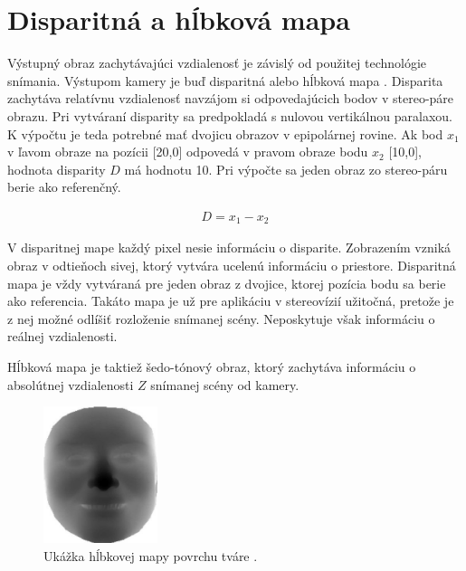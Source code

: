 %

\newpage

\section{Disparitná a hĺbková mapa}


Výstupný obraz zachytávajúci vzdialenosť je závislý od použitej technológie snímania. Výstupom kamery je buď disparitná alebo hĺbková mapa \cite{davies2004machine}. Disparita zachytáva relatívnu vzdialenosť navzájom si odpovedajúcich bodov v stereo-páre
obrazu. Pri vytváraní disparity sa predpokladá s nulovou vertikálnou paralaxou. K výpočtu je teda potrebné mať dvojicu obrazov v epipolárnej rovine. Ak bod $x_1$ v ľavom obraze na pozícii [20,0] odpovedá v pravom obraze bodu $x_2$ [10,0], hodnota disparity $D$ má hodnotu 10. Pri výpočte sa jeden obraz zo stereo-páru berie ako referenčný.  
	
\begin{equation}
\label{eq:disp}
\begin{aligned}
D=x_1-x_2
\end{aligned}
\end{equation}

V disparitnej mape každý pixel nesie informáciu o disparite. Zobrazením vzniká obraz v odtieňoch sivej, ktorý vytvára ucelenú informáciu o priestore. Disparitná mapa je vždy vytváraná pre jeden obraz z dvojice, ktorej pozícia bodu sa berie ako referencia. Takáto mapa je už pre aplikáciu v stereovízií užitočná, pretože je z nej možné odlíšiť rozloženie snímanej scény. Neposkytuje však informáciu o reálnej vzdialenosti.

Hĺbková mapa je taktiež šedo-tónový obraz, ktorý zachytáva informáciu o absolútnej vzdialenosti $Z$ snímanej scény od kamery. 

\begin{figure}[H]
	\centering
	\includegraphics[height=4cm]{figures/depth_map.jpeg} 
	\caption{Ukážka hĺbkovej mapy povrchu tváre \cite{fabry2010surface}.}
	\label{fig:depth_map}
\end{figure}

